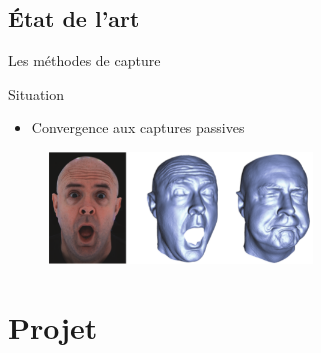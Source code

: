 \documentclass[compress,pdf,11pt,xcolor=dvipsnames]{beamer}
\begin{document}
\subsection{État de l'art}

\begin{frame}{Les méthodes de capture}
  
        \begin{exampleblock}{Situation}
          \begin{itemize}
          \item Convergence aux captures passives
          \end{itemize}
        \end{exampleblock}
        
        
        \begin{figure}
          \centering
          \includegraphics[width=7cm]{img/man}
        \end{figure}

\end{frame}


\section{Projet}
\end{document}
